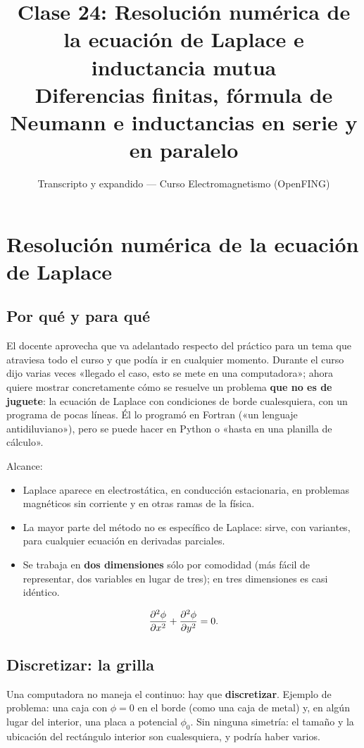 \documentclass[12pt,a4paper]{article}
\title{\textbf{Clase 24: Resolución numérica de la ecuación de Laplace e inductancia mutua} \\[0.3em]
        \large{Diferencias finitas, fórmula de Neumann e inductancias en serie y en paralelo}}
\author{Transcripto y expandido --- Curso Electromagnetismo (OpenFING)}
\date{}
\begin{document}
\maketitle
\thispagestyle{empty}
\newpage

\tableofcontents
\newpage

\section{Resolución numérica de la ecuación de Laplace}

\subsection{Por qué y para qué}

El docente aprovecha que va adelantado respecto del práctico para un tema que
atraviesa todo el curso y que podía ir en cualquier momento. Durante el curso
dijo varias veces «llegado el caso, esto se mete en una computadora»; ahora
quiere mostrar concretamente cómo se resuelve un problema \textbf{que no es de
juguete}: la ecuación de Laplace con condiciones de borde cualesquiera, con
un programa de pocas líneas. Él lo programó en Fortran («un lenguaje
antidiluviano»), pero se puede hacer en Python o «hasta en una planilla de
cálculo».

Alcance:

\begin{itemize}
  \item Laplace aparece en electrostática, en conducción estacionaria, en problemas
  magnéticos sin corriente y en otras ramas de la física.
  \item La mayor parte del método no es específico de Laplace: sirve, con variantes,
  para cualquier ecuación en derivadas parciales.
  \item Se trabaja en \textbf{dos dimensiones} sólo por comodidad (más fácil de
  representar, dos variables en lugar de tres); en tres dimensiones es casi
  idéntico.
\end{itemize}

\[
\pdv[2]{\phi}{x} + \pdv[2]{\phi}{y} = 0 .
\]

\subsection{Discretizar: la grilla}

Una computadora no maneja el continuo: hay que \textbf{discretizar}. Ejemplo de
problema: una caja con $\phi = 0$ en el borde (como una caja de metal) y, en
algún lugar del interior, una placa a potencial $\phi_0$. Sin ninguna simetría:
el tamaño y la ubicación del rectángulo interior son cualesquiera, y podría
haber varios.
\end{document}

